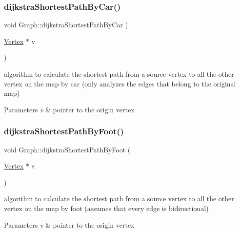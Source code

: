 \subsubsection{\texorpdfstring{dijkstra\+Shortest\+Path\+By\+Car()}{dijkstraShortestPathByCar()}}
{\footnotesize\ttfamily void Graph\+::dijkstra\+Shortest\+Path\+By\+Car (\begin{DoxyParamCaption}\item[{\hyperlink{class_vertex}{Vertex} $\ast$}]{v }\end{DoxyParamCaption})}



algorithm to calculate the shortest path from a source vertex to all the other vertex on the map by car (only analyzes the edges that belong to the original map) 


\begin{DoxyParams}{Parameters}
{\em v} & pointer to the origin vertex \\
\hline
\end{DoxyParams}
\hypertarget{class_graph_a3364873245a79903515c5cbcb502a479}{}\label{class_graph_a3364873245a79903515c5cbcb502a479} 
\subsubsection{\texorpdfstring{dijkstra\+Shortest\+Path\+By\+Foot()}{dijkstraShortestPathByFoot()}}
{\footnotesize\ttfamily void Graph\+::dijkstra\+Shortest\+Path\+By\+Foot (\begin{DoxyParamCaption}\item[{\hyperlink{class_vertex}{Vertex} $\ast$}]{v }\end{DoxyParamCaption})}



algorithm to calculate the shortest path from a source vertex to all the other vertex on the map by foot (assumes that every edge is bidirectional) 


\begin{DoxyParams}{Parameters}
{\em v} & pointer to the origin vertex \\
\hline
\end{DoxyParams}
\hypertarget{class_graph_abb5e0517e2979c54eebdafc2a9875e8f}{}\label{class_graph_abb5e0517e2979c54eebdafc2a9875e8f} 
